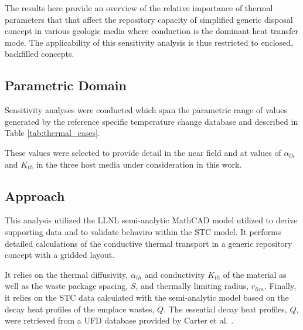 
The results here provide an overview of the relative importance of thermal
parameters that that affect the repository capacity of simplified generic
disposal concept in various geologic media where conduction is the dominant
heat transfer mode. The applicability of this sensitivity analysis is thus
restricted to enclosed, backfilled concepts.  

\subsection{Parametric Domain}

Sensitivity analyses were conducted which span the parametric range of values 
generated by the reference specific temperature change database and described 
in Table \ref{tab:thermal_cases}.  

These values were selected to provide detail in the near field and at values of
$\alpha_{th}$ and $K_{th}$ in the three host media under consideration in this
work.

\subsection{Approach}

This analysis utilized the \gls{LLNL} semi-analytic MathCAD model utilized to 
derive supporting data and to validate behaviro within the \Cyder STC model. It 
performs detailed calculations of the conductive thermal transport in a generic 
repository concept with a gridded layout.  

It relies on the thermal diffusivity, $\alpha_{th}$ and conductivity $K_{th}$ of 
the material as well as the waste package spacing, $S$, and thermally limiting 
radius, $r_{lim}$. Finally, it relies on the \gls{STC} data calculated with the 
semi-analytic model based on the decay heat profiles of the emplace wastes, $Q$. 
The essential decay heat profiles, $Q$, were retrieved from a \gls{UFD} database 
provided by Carter et al. \cite{carter_fuel_2011}.


